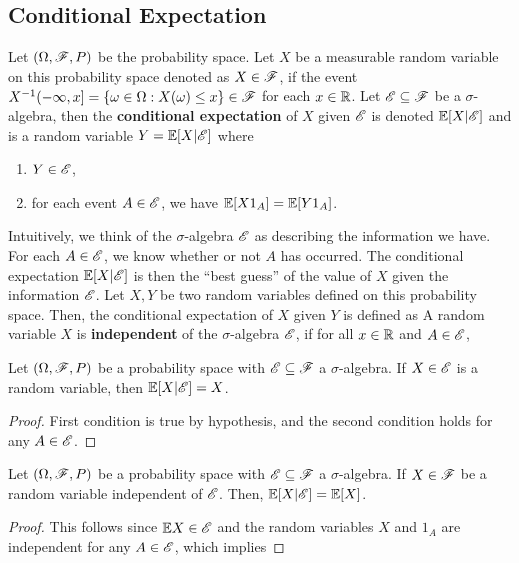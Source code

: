 \documentclass[letterpaper,10pt,english]{article}
\begin{document}
\subsection{Conditional Expectation} 
Let $(\Omega, \mathscr{F}, P)$ be the probability space.  
Let $X$ be a measurable random variable on this probability space denoted as $X \in \mathscr{F}$, 
if the event $X^{-1}(-\infty, x] = \{\omega \in \Omega: X(\omega) \leq x\} \in \mathscr{F}$ for each $x \in \mathbb{R}$.  
Let $\mathscr{E} \subseteq \mathscr{F}$ be a $\sigma$-algebra, then the \textbf{conditional expectation} of $X$ given $\mathscr{E}$ is denoted $\mathbb{E}[X | \mathscr{E}]$ and is a random variable $Y = \mathbb{E}[X | \mathscr{E}]$ where
\begin{enumerate}[i\_] 
\item $Y \in \mathscr{E}$,
\item for each event $A \in \mathscr{E}$, we have $\mathbb{E} [X1_A] = \mathbb{E}[Y1_A]$. 
\end{enumerate}
Intuitively, we think of the $\sigma$-algebra $\mathscr{E}$ as describing the information we have. 
For each $A \in \mathscr{E}$, we know whether or not $A$ has occurred. 
The conditional expectation $\mathbb{E}[X|\mathscr{E}]$ is then the ``best guess'' of the value of $X$ given the information $\mathscr{E}$. 
Let $X,Y$ be two random variables defined on this probability space. 
Then, the conditional expectation of $X$ given $Y$ is defined as 
A random variable $X$ is \textbf{independent} of the $\sigma$-algebra $\mathscr{E}$, if for all $x \in \mathbb{R}$ and $A \in \mathscr{E}$, 
\begin{lem}
Let $(\Omega, \mathscr{F}, P)$ be a probability space with $\mathscr{E} \subseteq \mathscr{F}$ a $\sigma$-algebra. 
If $X \in \mathscr{E}$ is a random variable, then $\mathbb{E}[X| \mathscr{E}] = X$. 
\end{lem}
\begin{proof} 
First condition is true by hypothesis, and the second condition holds for any $A \in \mathscr{E}$. 
\end{proof}
\begin{lem} 
Let $(\Omega, \mathscr{F}, P)$ be a probability space with $\mathscr{E} \subseteq \mathscr{F}$ a $\sigma$-algebra. 
If $X \in \mathscr{F}$ be a random variable independent of $\mathscr{E}$.  
Then, $\mathbb{E}[X| \mathscr{E}]  = \mathbb{E}[X]$. 
\end{lem}
\begin{proof}
This follows since $\mathbb{E} X \in \mathscr{E}$ and the random variables $X$ and $1_{A}$ are independent for any $A \in \mathscr{E}$, 
which implies 
\end{proof}
\end{document}
